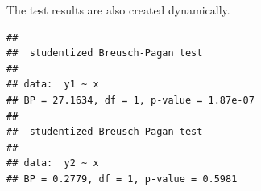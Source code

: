 \documentclass{article}\usepackage[]{graphicx}\usepackage[]{color}
\makeatletter
\newenvironment{kframe}{%
 \def\at@end@of@kframe{}%
 \ifinner\ifhmode%
  \def\at@end@of@kframe{\end{minipage}}%
  \begin{minipage}{\columnwidth}%
 \fi\fi%
 \def\FrameCommand##1{\hskip\@totalleftmargin \hskip-\fboxsep
 \colorbox{shadecolor}{##1}\hskip-\fboxsep
     \hskip-\linewidth \hskip-\@totalleftmargin \hskip\columnwidth}%
 \MakeFramed {\advance\hsize-\width
   \@totalleftmargin\z@ \linewidth\hsize
   \@setminipage}}%
 {\par\unskip\endMakeFramed%
 \at@end@of@kframe}
\newenvironment{knitrout}{}{} %
\makeatother
\begin{document}
The test results are also created dynamically. 

\begin{knitrout}
\color{fgcolor}\begin{kframe}
\begin{verbatim}
## 
## 	studentized Breusch-Pagan test
## 
## data:  y1 ~ x
## BP = 27.1634, df = 1, p-value = 1.87e-07
## 
## 	studentized Breusch-Pagan test
## 
## data:  y2 ~ x
## BP = 0.2779, df = 1, p-value = 0.5981
\end{verbatim}
\end{kframe}
\end{knitrout}
\end{document}
